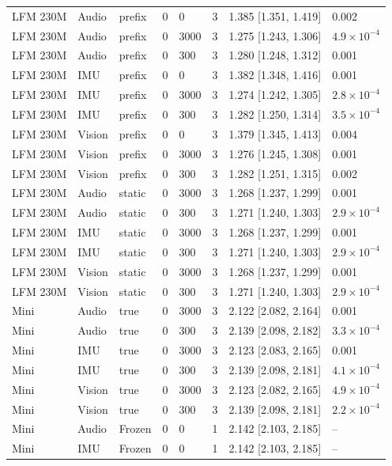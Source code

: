 {\begin{longtable}{@{}llllllll@{}}
LFM 230M & Audio & prefix & 0 & 0 & 3 & 1.385 [1.351, 1.419] & 0.002 \\
LFM 230M & Audio & prefix & 0 & 3000 & 3 & 1.275 [1.243, 1.306] & $4.9\times10^{-4}$ \\
LFM 230M & Audio & prefix & 0 & 300 & 3 & 1.280 [1.248, 1.312] & 0.001 \\
LFM 230M & IMU & prefix & 0 & 0 & 3 & 1.382 [1.348, 1.416] & 0.001 \\
LFM 230M & IMU & prefix & 0 & 3000 & 3 & 1.274 [1.242, 1.305] & $2.8\times10^{-4}$ \\
LFM 230M & IMU & prefix & 0 & 300 & 3 & 1.282 [1.250, 1.314] & $3.5\times10^{-4}$ \\
LFM 230M & Vision & prefix & 0 & 0 & 3 & 1.379 [1.345, 1.413] & 0.004 \\
LFM 230M & Vision & prefix & 0 & 3000 & 3 & 1.276 [1.245, 1.308] & 0.001 \\
LFM 230M & Vision & prefix & 0 & 300 & 3 & 1.282 [1.251, 1.315] & 0.002 \\
LFM 230M & Audio & static & 0 & 3000 & 3 & 1.268 [1.237, 1.299] & 0.001 \\
LFM 230M & Audio & static & 0 & 300 & 3 & 1.271 [1.240, 1.303] & $2.9\times10^{-4}$ \\
LFM 230M & IMU & static & 0 & 3000 & 3 & 1.268 [1.237, 1.299] & 0.001 \\
LFM 230M & IMU & static & 0 & 300 & 3 & 1.271 [1.240, 1.303] & $2.9\times10^{-4}$ \\
LFM 230M & Vision & static & 0 & 3000 & 3 & 1.268 [1.237, 1.299] & 0.001 \\
LFM 230M & Vision & static & 0 & 300 & 3 & 1.271 [1.240, 1.303] & $2.9\times10^{-4}$ \\
Mini & Audio & true & 0 & 3000 & 3 & 2.122 [2.082, 2.164] & 0.001 \\
Mini & Audio & true & 0 & 300 & 3 & 2.139 [2.098, 2.182] & $3.3\times10^{-4}$ \\
Mini & IMU & true & 0 & 3000 & 3 & 2.123 [2.083, 2.165] & 0.001 \\
Mini & IMU & true & 0 & 300 & 3 & 2.139 [2.098, 2.181] & $4.1\times10^{-4}$ \\
Mini & Vision & true & 0 & 3000 & 3 & 2.123 [2.082, 2.165] & $4.9\times10^{-4}$ \\
Mini & Vision & true & 0 & 300 & 3 & 2.139 [2.098, 2.181] & $2.2\times10^{-4}$ \\
Mini & Audio & Frozen & 0 & 0 & 1 & 2.142 [2.103, 2.185] & -- \\
Mini & IMU & Frozen & 0 & 0 & 1 & 2.142 [2.103, 2.185] & -- \\

\end{longtable}}

